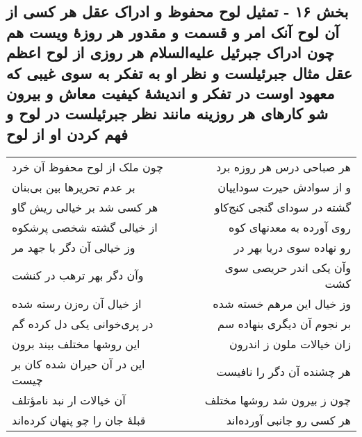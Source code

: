 \begin{center}
\section*{بخش ۱۶ - تمثیل لوح محفوظ و ادراک عقل هر کسی از آن لوح آنک امر و قسمت و مقدور هر روزهٔ ویست هم چون ادراک جبرئیل علیه‌السلام  هر روزی از لوح اعظم  عقل مثال جبرئیلست و نظر او به تفکر به سوی غیبی که معهود اوست در  تفکر و اندیشهٔ کیفیت معاش و بیرون شو کارهای هر روزینه مانند نظر  جبرئیلست در لوح و فهم کردن او از لوح}
\label{sec:sh016}
\begin{longtable}{l p{0.5cm} r}
چون ملک از لوح محفوظ آن خرد
&&
هر صباحی درس هر روزه برد
\\
بر عدم تحریرها بین بی‌بنان
&&
و از سوادش حیرت سوداییان
\\
هر کسی شد بر خیالی ریش گاو
&&
گشته در سودای گنجی کنج‌کاو
\\
از خیالی گشته شخصی پرشکوه
&&
روی آورده به معدنهای کوه
\\
وز خیالی آن دگر با جهد مر
&&
رو نهاده سوی دریا بهر در
\\
وآن دگر بهر ترهب در کنشت
&&
وآن یکی اندر حریصی سوی کشت
\\
از خیال آن ره‌زن رسته شده
&&
وز خیال این مرهم خسته شده
\\
در پری‌خوانی یکی دل کرده گم
&&
بر نجوم آن دیگری بنهاده سم
\\
این روشها مختلف بیند برون
&&
زان خیالات ملون ز اندرون
\\
این در آن حیران شده کان بر چیست
&&
هر چشنده آن دگر را نافیست
\\
آن خیالات ار نبد نامؤتلف
&&
چون ز بیرون شد روشها مختلف
\\
قبلهٔ جان را چو پنهان کرده‌اند
&&
هر کسی رو جانبی آورده‌اند
\\
\end{longtable}
\end{center}
